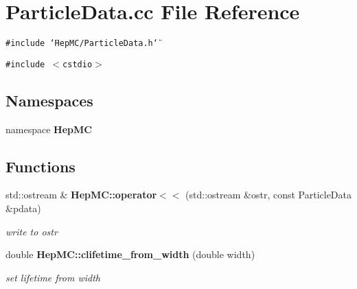 \section{Particle\-Data.cc File Reference}
\label{ParticleData_8cc}
{\tt \#include \char`\"{}Hep\-MC/Particle\-Data.h\char`\"{}}\par
{\tt \#include $<$cstdio$>$}\par
\subsection*{Namespaces}
\begin{CompactItemize}
\item 
namespace {\bf Hep\-MC}
\end{CompactItemize}
\subsection*{Functions}
\begin{CompactItemize}
\item 
std::ostream \& {\bf Hep\-MC::operator$<$$<$} (std::ostream \&ostr, const Particle\-Data \&pdata)
\begin{CompactList}\small\item\em write to ostr \item\end{CompactList}\item 
double {\bf Hep\-MC::clifetime\_\-from\_\-width} (double width)
\begin{CompactList}\small\item\em set lifetime from width \item\end{CompactList}\end{CompactItemize}

